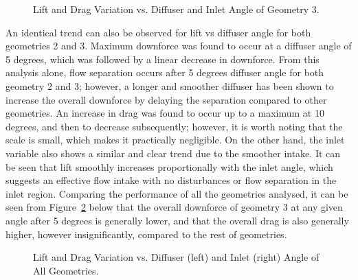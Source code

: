 \begin{figure}[!h]
    \noindent{}
    \caption{Lift and Drag Variation vs. Diffuser and Inlet Angle of Geometry 3.}
    \label{fig:2D_OF_A4_results}
\end{figure}

\noindent An identical trend can also be observed for lift vs diffuser angle for both geometries 2 and 3. Maximum downforce was found to occur at a diffuser angle of 5 degrees, which was followed by a linear decrease in downforce. From this analysis alone, flow separation occurs after 5 degrees diffuser angle for both geometry 2 and 3; however, a longer and smoother diffuser has been shown to increase the overall downforce by delaying the separation compared to other geometries. An increase in drag was found to occur up to a maximum at 10 degrees, and then to decrease subsequently; however, it is worth noting that the scale is small, which makes it practically negligible. On the other hand, the inlet variable also shows a similar and clear trend due to the smoother intake. It can be seen that lift smoothly increases proportionally with the inlet angle, which suggests an effective flow intake with no disturbances or flow separation in the inlet region. Comparing the performance of all the geometries analysed, it can be seen from Figure~\ref{fig:2D_OF_PLOT_COMPARE_ALL} below that the overall downforce of geometry 3 at any given angle after 5 degrees is generally lower, and that the overall drag is also generally higher, however insignificantly, compared to the rest of geometries.

\begin{figure}[h!]
    \noindent{}
    \caption{Lift and Drag Variation vs. Diffuser (left) and Inlet (right) Angle of All Geometries.}
    \label{fig:2D_OF_PLOT_COMPARE_ALL}
\end{figure}

